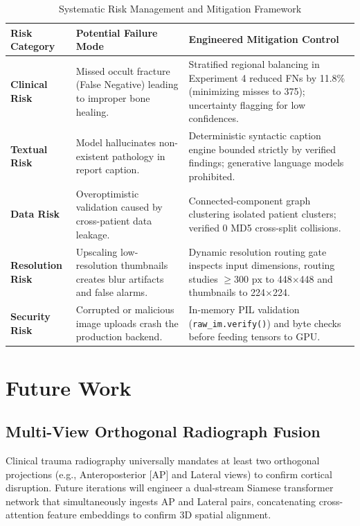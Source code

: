 \documentclass[12pt, a4paper]{report}
\begin{document}
\begin{table}[H]
\centering
\caption{Systematic Risk Management and Mitigation Framework}
\label{tab:risks}
\begin{tabularx}{\textwidth}{lXp{5.5cm}}
\toprule
\textbf{Risk Category} & \textbf{Potential Failure Mode} & \textbf{Engineered Mitigation Control} \\
\midrule
\textbf{Clinical Risk} & Missed occult fracture (False Negative) leading to improper bone healing. & Stratified regional balancing in Experiment 4 reduced FNs by 11.8\% (minimizing misses to 375); uncertainty flagging for low confidences. \\
\addlinespace
\textbf{Textual Risk} & Model hallucinates non-existent pathology in report caption. & Deterministic syntactic caption engine bounded strictly by verified findings; generative language models prohibited. \\
\addlinespace
\textbf{Data Risk} & Overoptimistic validation caused by cross-patient data leakage. & Connected-component graph clustering isolated patient clusters; verified 0 MD5 cross-split collisions. \\
\addlinespace
\textbf{Resolution Risk} & Upscaling low-resolution thumbnails creates blur artifacts and false alarms. & Dynamic resolution routing gate inspects input dimensions, routing studies $\ge 300\text{ px}$ to 448$\times$448 and thumbnails to 224$\times$224. \\
\addlinespace
\textbf{Security Risk} & Corrupted or malicious image uploads crash the production backend. & In-memory PIL validation (\texttt{raw\_im.verify()}) and byte checks before feeding tensors to GPU. \\
\bottomrule
\end{tabularx}
\end{table}

\newpage
\chapter{Future Work}

\section{Multi-View Orthogonal Radiograph Fusion}
Clinical trauma radiography universally mandates at least two orthogonal projections (e.g., Anteroposterior [AP] and Lateral views) to confirm cortical disruption. Future iterations will engineer a dual-stream Siamese transformer network that simultaneously ingests AP and Lateral pairs, concatenating cross-attention feature embeddings to confirm 3D spatial alignment.
\end{document}

